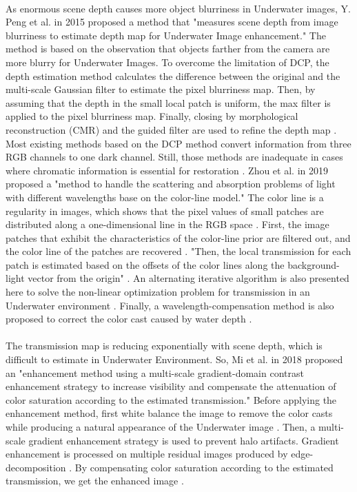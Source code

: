 \documentclass[a4paper,11pt,oneside]{article}
\begin{document}
  \\
  As enormous scene depth causes more object blurriness in Underwater images, Y. Peng et al. in 2015 \cite{3} proposed a method that "measures scene depth from image blurriness to estimate depth map for Underwater Image enhancement." The method is based on the observation that objects farther from the camera are more blurry for Underwater Images. To overcome the limitation of DCP, the depth estimation method calculates the difference between the original and the multi-scale Gaussian filter to estimate the pixel blurriness map. Then, by assuming that the depth in the small local patch is uniform, the max filter is applied to the pixel blurriness map. Finally, closing by morphological reconstruction (CMR) and the guided filter are used to refine the depth map \cite{3}.\\
   Most existing methods based on the DCP method convert information from three RGB channels to one dark channel. Still, those methods are inadequate in cases where chromatic information is essential for restoration \cite{17}. Zhou et al. in 2019 \cite{17} proposed a "method to handle the scattering and absorption problems of light with different wavelengths base on the color-line model." The color line is a regularity in images, which shows that the pixel values of small patches are distributed along a  one-dimensional line in the RGB space \cite{17}. First, the image patches that exhibit the characteristics of the color-line prior are filtered out, and the color line of the patches are recovered \cite{17}. "Then, the local transmission for each patch is estimated based on the offsets of the color lines along the background-light vector from the origin" \cite{17}. An alternating iterative algorithm is also presented here to solve the non-linear optimization problem for transmission in an Underwater environment \cite{17}. Finally, a wavelength-compensation method is also proposed to correct the color cast caused by water depth \cite{17}.\\
  \\
  The transmission map is reducing exponentially with scene depth, which is difficult to estimate in Underwater Environment. So, Mi et al. in 2018 \cite{11} proposed an "enhancement method using a multi-scale gradient-domain contrast enhancement strategy to increase visibility and compensate the attenuation of color saturation according to the estimated transmission." Before applying the enhancement method, first white balance the image to remove the color casts while producing a natural appearance of the Underwater image \cite{11}. Then, a multi-scale gradient enhancement strategy is used to prevent halo artifacts. Gradient enhancement is processed on multiple residual images produced by edge-decomposition \cite{11}. By compensating color saturation according to the estimated transmission, we get the enhanced image \cite{11}.\\ 
\end{document}
